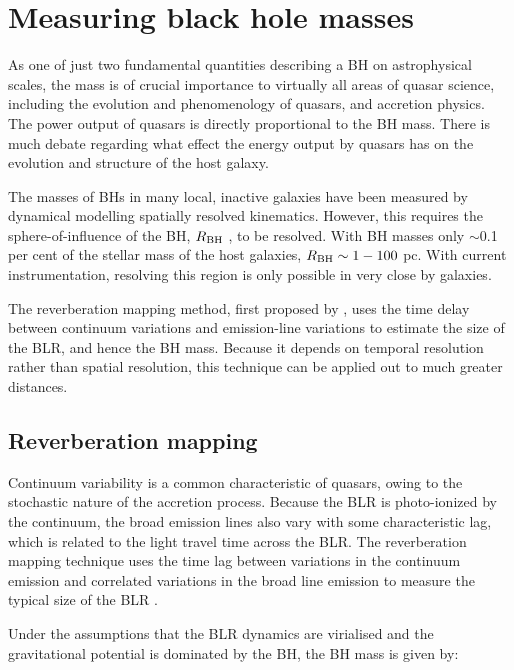\section{Measuring black hole masses}

As one of just two fundamental quantities describing a BH on astrophysical scales, the mass is of crucial importance to virtually all areas of quasar science, including the evolution and phenomenology of quasars, and accretion physics.
The power output of quasars is directly proportional to the BH mass. 
There is much debate regarding what effect the energy output by quasars has on the evolution and structure of the host galaxy. 

The masses of BHs in many local, inactive galaxies have been measured by dynamical modelling spatially resolved kinematics. 
However, this requires the sphere-of-influence of the BH, $R_{\rm BH}$ , to be resolved. 
With BH masses only $\sim$0.1 per cent of the stellar mass of the host galaxies, $R_{\rm BH}\sim1-100$ pc.
With current instrumentation, resolving this region is only possible in very close by galaxies. 

The reverberation mapping method, first proposed by \citet{blandford82a}, uses the time delay between continuum variations and emission-line variations to estimate the size of the BLR, and hence the BH mass. 
Because it depends on temporal resolution rather than spatial resolution, this technique can be applied out to much greater distances. 

\subsection{Reverberation mapping}

Continuum variability is a common characteristic of quasars, owing to the stochastic nature of the accretion process.  
Because the BLR is photo-ionized by the continuum, the broad emission lines also vary with some characteristic lag, which is related to the light travel time across the BLR. 
The reverberation mapping technique uses the time lag between variations in the continuum emission and correlated variations in the broad line emission to measure the typical size of the BLR \citep[e.g.][]{peterson93,netzer97,peterson14}. 

Under the assumptions that the BLR dynamics are virialised  and the gravitational potential is dominated by the BH, the BH mass is given by:

